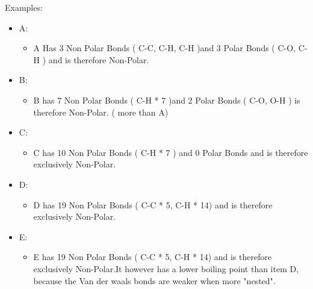 \documentclass{article}
\begin{document}
\clearpage
Examples:\hfill
\begin{itemize}
    \item A:  \hspace{1cm}
    \begin{itemize}
        \item A Has 3 Non Polar Bonds ( C-C, C-H, C-H )\hfill\break and 3 Polar Bonds ( C-O, C-H ) and is therefore Non-Polar.
    \end{itemize}
    \item B:  
    \begin{itemize}
        \item B has 7 Non Polar Bonds ( C-H * 7 )\hfill\break and 2 Polar Bonds ( C-O, O-H ) is therefore Non-Polar. ( more than A)
    \end{itemize}
    \item C:  
    \begin{itemize}
        \item C has 10 Non Polar Bonds ( C-H * 7 ) and 0 Polar Bonds and is therefore exclusively Non-Polar.
    \end{itemize}
    \item D:  
    \begin{itemize}
        \item D  has 19 Non Polar Bonds ( C-C * 5, C-H * 14) and is therefore exclusively Non-Polar.
    \end{itemize}
    \item E:  
    \begin{itemize}
        \item E  has 19 Non Polar Bonds ( C-C * 5, C-H * 14) and is therefore exclusively Non-Polar.\hfill\break It however has a lower boiling point than item D, because the Van der waals bonds are weaker when more "nested".
    \end{itemize}


\end{itemize}
\clearpage
\end{document}
